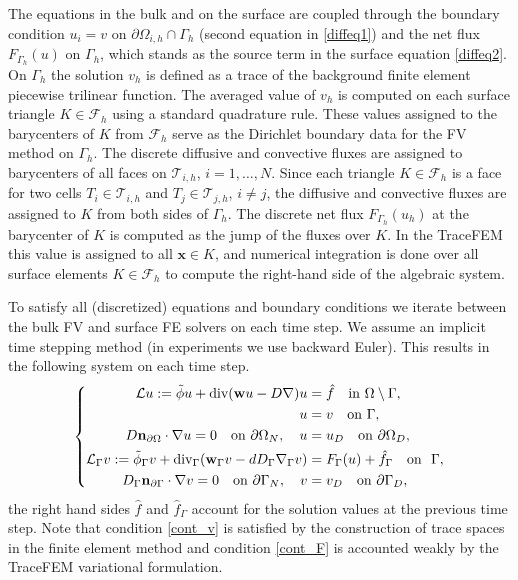 \documentclass{article}
\newcommand{\bn}{\mathbf n}
\newcommand{\bw}{\mathbf w}
\newcommand{\bx}{\mathbf x}
\newcommand{\F}{\mathcal F}
\newcommand{\T}{\mathcal T}
\newcommand{\cL}{\mathcal L}
\newcommand{\Div}{\mbox{\rm div}}
\def\dO{{\partial\Omega} }
\def\dG{{\partial\Gamma} }
\begin{document}
The equations in the bulk and on the surface are coupled through the boundary condition $u_i=v$ on $\partial\Omega_{i,h}\cap\Gamma_h$ (second equation in \eqref{diffeq1}) and the net flux $F_{\Gamma_h}(u)$ on $\Gamma_h$, which stands as the source term in the surface equation \eqref{diffeq2}. On $\Gamma_h$ the solution $v_h$ is defined as a trace of the background finite element piecewise trilinear function. The averaged value
 of $v_h$ is computed on each surface triangle $K\in\F_h$ using a standard quadrature rule. These values assigned to the barycenters of $K$ from $\F_h$ serve as the Dirichlet boundary data for the FV method on $\Gamma_h$.
 The discrete diffusive and convective fluxes are assigned to barycenters of all faces on $\T_{i,h}$, $i=1,\dots,N$.
Since each triangle $K\in\F_h$ is a face for two cells $T_i\in\T_{i,h}$ and  $T_j\in\T_{j,h}$, $i\neq j$,
the diffusive and convective fluxes are assigned to $K$ from both sides of $\Gamma_h$.
The discrete net flux $F_{\Gamma_h}(u_h)$ at the barycenter of $K$ is computed as the jump of the fluxes over $K$.
In the TraceFEM this value is assigned to all $\bx\in K$, and numerical integration is  done over all surface elements $K\in\F_h$ to compute the right-hand side of the algebraic system.

To satisfy all (discretized) equations and boundary conditions we iterate between the bulk FV and surface FE solvers on each time step. %
We assume an implicit time stepping method (in experiments we use backward Euler). This results in the following system on each time step.
\begin{equation} \label{system}
\left\{
\begin{aligned}
 \cL u:= \tilde\phi u + \Div(\bw  u- D \nabla) u &= \hat{f} \quad \text{in}~ \Omega\setminus\Gamma,\\
 u&=v \quad \text{on}~ \Gamma,\\
 {D}\bn_\dO\cdot\nabla u=0 \quad \text{on}~ \dO_N,\quad u&=u_D \quad \text{on}~ \dO_D,\\
 \cL_\Gamma v:=\tilde\phi_\Gamma v + \Div_\Gamma (\bw_\Gamma v - d D_\Gamma \nabla_\Gamma v) &=  F_\Gamma(u)+ \hat{f}_\Gamma  \quad \text{on}~~\Gamma,\\
 {D}_\Gamma\bn_\dG\cdot\nabla v=0 \quad \text{on}~ \dG_N,\quad v&=v_D \quad \text{on}~ \dG_D,
 \end{aligned}
\right.
\end{equation}
the right hand sides $\hat{f}$ and $\hat{f}_\Gamma$ account for the  solution values at the previous time step. Note that condition \eqref{cont_v} is satisfied by the construction of trace spaces in the finite element method
and condition \eqref{cont_F} is accounted weakly by the TraceFEM variational formulation.
\end{document}
